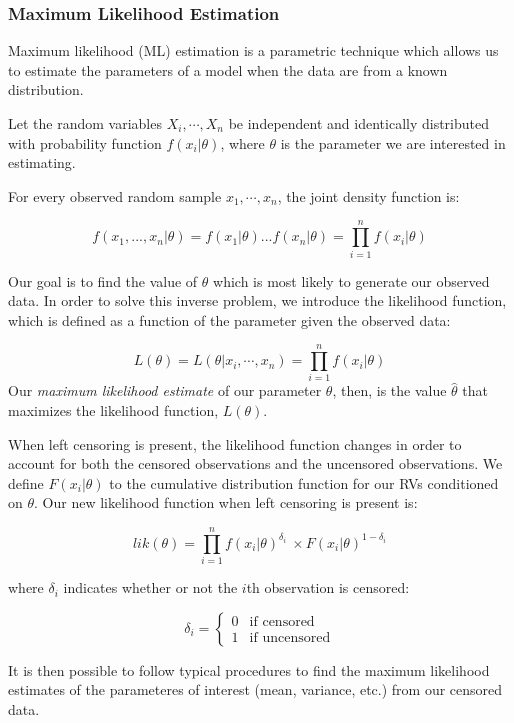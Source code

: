 \documentclass[
]{article}
\begin{document}
\hypertarget{MLE}{%
\subsubsection{Maximum Likelihood Estimation}\label{MLE}}

Maximum likelihood (ML) estimation is a parametric technique which
allows us to estimate the parameters of a model when the data are from a
known distribution.

Let the random variables \(X_i, \cdots, X_n\) be independent and
identically distributed with probability function \(f(x_i|\theta)\),
where \(\theta\) is the parameter we are interested in estimating.

For every observed random sample \(x_1,\cdots,x_n\), the joint density
function is:

\[f(x_1,...,x_n|\theta) = f(x_1|\theta)...f(x_n|\theta) = \prod_{i=1}^{n}f(x_i|\theta)\]

Our goal is to find the value of \(\theta\) which is most likely to
generate our observed data. In order to solve this inverse problem, we
introduce the likelihood function, which is defined as a function of the
parameter given the observed data:

\[L(\theta) = L(\theta|x_i, \cdots, x_n) = \prod_{i=1}^{n}f(x_i|\theta)\]
Our \emph{maximum likelihood estimate} of our parameter \(\theta\),
then, is the value \(\hat{\theta}\) that maximizes the likelihood
function, \(L(\theta)\).

When left censoring is present, the likelihood function changes in order
to account for both the censored observations and the uncensored
observations. We define \(F(x_i|\theta)\) to the cumulative distribution
function for our RVs conditioned on \(\theta\). Our new likelihood
function when left censoring is present is:

\[lik(\theta) = \prod_{i=1}^n f(x_i|\theta)^{\delta_{i}} \ \times F(x_i|\theta)^{1-{\delta_{i}}}\]

\noindent where \(\delta_{i}\) indicates whether or not the \(i\)th
observation is censored:

\[\delta_i =
\begin{cases}
  0 & \text{if censored} \\
  1 & \text{if uncensored}
\end{cases}\]

It is then possible to follow typical procedures to find the maximum
likelihood estimates of the parameteres of interest (mean, variance,
etc.) from our censored data.
\end{document}
